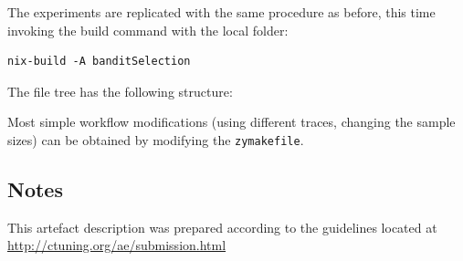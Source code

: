 \documentclass[sigconf,anonymous]{acmart}
\begin{document}
The experiments are replicated with the same procedure as before, this time
invoking the build command with the local folder:

\begin{lstlisting}
nix-build -A banditSelection
\end{lstlisting}

The file tree has the following structure:


Most simple workflow modifications (using different traces, changing the sample
sizes) can be obtained by modifying the
\lstinline[basicstyle=\ttfamily\color{blue}]|zymakefile|.

\subsection{Notes}

This artefact description was prepared according to the guidelines located at
\url{http://ctuning.org/ae/submission.html}
\end{document}
